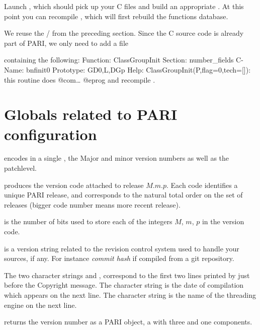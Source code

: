 \item Launch , which should pick up your C files and build an
appropriate . At this point you can recompile , which
will first rebuild the functions database.

 We reuse the  / 
from the preceding section. Since the C source code is already part
of PARI, we only need to add a file


\noindent containing the following:
\bprog
Function: ClassGroupInit
Section: number_fields
C-Name: bnfinit0
Prototype: GD0,L,DGp
Help: ClassGroupInit(P,{flag=0},{tech=[]}): this routine does @com\dots
@eprog\noindent
and recompile .

\section{Globals related to PARI configuration}

\noindent {} encodes in a single , the Major
and minor version numbers as well as the patchlevel.

 produces the version code
attached to release $M.m.p$. Each code identifies a unique PARI release,
and corresponds to the natural total order on the set of releases (bigger
code number means more recent release).

\noindent {} is the number of bits used to store each of
the integers $M$, $m$, $p$ in the version code.

\noindent {} is a version string related to the
revision control system used to handle your sources, if any. For instance
\emph{commit hash} if compiled from a git repository.

The two character strings  and ,
correspond to the first two lines printed by  just before the
Copyright message. The character string  is the
date of compilation which appears on the next line. The character string
 is the name of the threading engine on the next line.

 returns the version number as a PARI object, a
 with three  and one  components.

